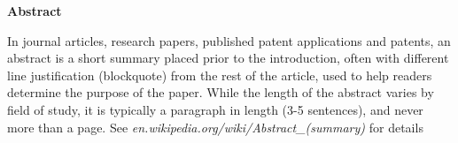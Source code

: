 \clearpage
\null
\vfil %
\begin{center}\textbf{Abstract}\end{center}
In journal articles, research papers, published patent applications and patents, an abstract is a short summary placed prior to the introduction, often with different line justification (blockquote) from the rest of the article, used to help readers determine the purpose of the paper. While the length of the abstract varies by field of study, it is typically a paragraph in length (3-5 sentences), and never more than a page. See
\emph{en.wikipedia.org/wiki/Abstract\_(summary)} for details
\vfil
\clearpage 

